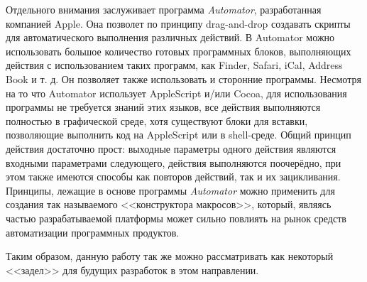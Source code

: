 Отдельного внимания заслуживает программа {\it Automator}, разработанная компанией Apple. Она позволет по принципу drag-and-drop создавать скрипты для автоматического выполнения различных действий. В Automator можно использовать большое количество готовых программных блоков, выполняющих действия с использованием таких программ, как Finder, Safari, iCal, Address Book и т. д. Он позволяет также использовать и сторонние программы. Несмотря на то что Automator использует AppleScript и/или Cocoa, для использования программы не требуется знаний этих языков, все действия выполняются полностью в графической среде, хотя существуют блоки для вставки, позволяющие выполнить код на AppleScript или в shell-среде. Общий принцип действия достаточно прост: выходные параметры одного действия являются входными параметрами следующего, действия выполняются поочерёдно, при этом также имеются способы как повторов действий, так и их зацикливания.~\cite{automator-website} Принципы, лежащие в основе программы {\it Automator} можно применить для создания так называемого <<конструктора макросов>>, который, являясь частью разрабатываемой платформы может сильно повлиять на рынок средств автоматизации программных продуктов.

Таким образом, данную работу так же можно рассматривать как некоторый <<задел>> для будущих разработок в этом направлении.

\pagebreak
